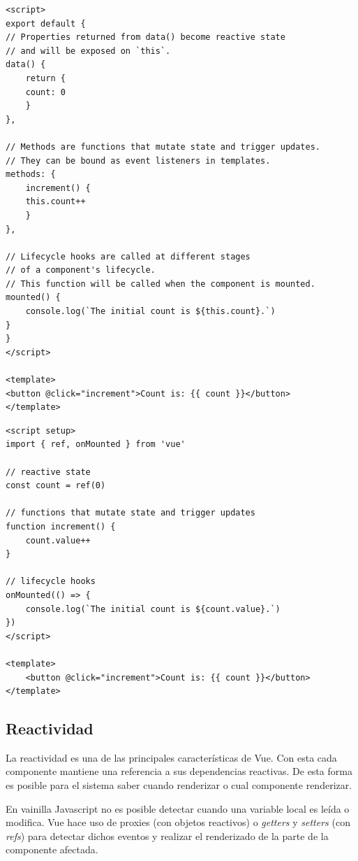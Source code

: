 \hspace{-0.65cm}\begin{minipage}{0.5\textwidth}
    \begin{lstlisting}[basicstyle=\ttfamily\tiny, numbers=none, caption=Options API.]
<script>
export default {
// Properties returned from data() become reactive state
// and will be exposed on `this`.
data() {
    return {
    count: 0
    }
},

// Methods are functions that mutate state and trigger updates.
// They can be bound as event listeners in templates.
methods: {
    increment() {
    this.count++
    }
},

// Lifecycle hooks are called at different stages
// of a component's lifecycle.
// This function will be called when the component is mounted.
mounted() {
    console.log(`The initial count is ${this.count}.`)
}
}
</script>

<template>
<button @click="increment">Count is: {{ count }}</button>
</template>
    \end{lstlisting}
\end{minipage}
\begin{minipage}{0.5\textwidth}
    \begin{lstlisting}[basicstyle=\ttfamily\tiny, numbers=none, caption=Composition API.]
<script setup>
import { ref, onMounted } from 'vue'

// reactive state
const count = ref(0)

// functions that mutate state and trigger updates
function increment() {
    count.value++
}

// lifecycle hooks
onMounted(() => {
    console.log(`The initial count is ${count.value}.`)
})
</script>

<template>
    <button @click="increment">Count is: {{ count }}</button>
</template>
    \end{lstlisting}
\end{minipage}

\subsection{Reactividad}

La reactividad es una de las principales características de Vue. Con esta cada componente mantiene una referencia a sus dependencias reactivas. De esta forma es posible para el sistema saber cuando renderizar o cual componente renderizar.

En vainilla Javascript no es posible detectar cuando una variable local es leída o modifica. Vue hace uso de proxies (con objetos reactivos) o \textit{getters} y \textit{setters} (con \textit{refs}) para detectar dichos eventos y realizar el renderizado de la parte de la componente afectada.

